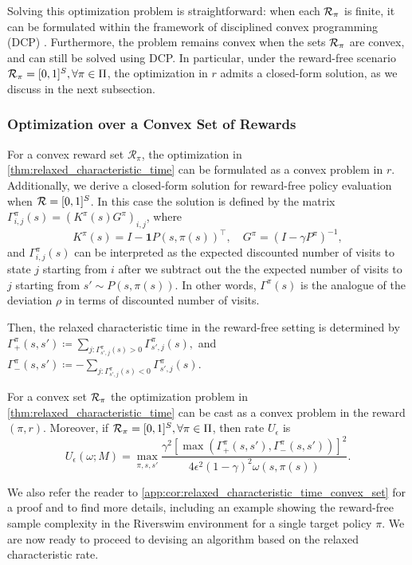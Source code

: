 Solving this optimization problem is straightforward:  when each ${\cal R}_\pi$ is finite, it can be formulated within the framework of disciplined convex programming (DCP) \cite{grant2006disciplined}. Furthermore, the problem remains convex when the sets ${\cal R}_\pi$ are convex, and can still be solved using DCP. In particular, under the reward-free scenario ${\cal R}_\pi=[0,1]^S, \forall \pi \in \Pi$, the  optimization in $r$ admits a closed-form solution, as we discuss in the next subsection.


\subsubsection{Optimization over a Convex Set of Rewards}
For a convex reward set $\mathcal{R}_\pi$, the optimization  in 
\cref{thm:relaxed_characteristic_time} can be formulated as a convex problem in $r$. 
Additionally, we derive a closed-form solution for reward-free policy evaluation when ${\cal R} = [0,1]^S$. In this case the solution is defined by the matrix $\Gamma_{i,j}^\pi(s) = \left(K^\pi(s) G^\pi\right)_{i,j}$, where
\[
    K^\pi(s) = I - \mathbf{1} P(s,\pi(s))^\top, \quad G^\pi = (I - \gamma P^\pi)^{-1},
\]
and $\Gamma_{i,j}^\pi(s)$ can be interpreted as the expected discounted number of visits to state $j$ starting from $i$ after we subtract out the the expected number of visits to $j$ starting from $s'\sim  P(s,\pi(s))$. In other words, $\Gamma^\pi(s)$ is the analogue of the  deviation $\rho$ in terms of discounted number of visits.

Then, the relaxed characteristic time  in the reward-free setting is determined by
$ \Gamma_+^\pi(s,s') \coloneqq \sum_{j: \Gamma_{s',j}^\pi(s)>0} \Gamma_{s',j}^\pi(s),$ and  $
     \Gamma_-^\pi(s,s') \coloneqq -\sum_{j: \Gamma_{s',j}^\pi(s)<0} \Gamma_{s',j}^\pi(s)$.
\begin{tcolorbox}
\begin{corollary}\label{cor:relaxed_characteristic_time_convex_set}
    For a convex set ${\cal R}_\pi$ the optimization problem in \cref{thm:relaxed_characteristic_time} can be cast as a convex problem in the reward $(\pi,r)$.
Moreover, if ${\cal R}_\pi=[0,1]^S,\forall \pi\in \Pi$, then rate $U_\epsilon$ is
    \[
    U_\epsilon(\omega;M) =  \max_{\pi,s,s'} \frac{\gamma^2 \left[\max\left(\Gamma_{+}^\pi(s,s'),\Gamma_{-}^\pi(s,s')\right)\right]^2}{4\epsilon^2(1-\gamma)^2 \omega(s,\pi(s))}.
    \]
\end{corollary}
\end{tcolorbox}
We also refer the reader to \cref{app:cor:relaxed_characteristic_time_convex_set} for a proof and to find more details, including  an example showing the reward-free sample complexity in the Riverswim environment \cite{strehl2004empirical} for a single  target policy $\pi$. We are now ready to proceed to devising an algorithm based on the relaxed characteristic rate.

